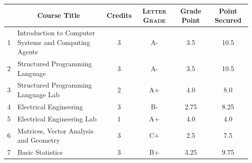 \documentclass[11pt]{article}
\newcommand*{\numtwo}[1]{\pgfmathprintnumber[
                    fixed, precision=2, fixed zerofill=true]{#1}}
\begin{document}
                \begin{center}
                    \renewcommand{\arraystretch}{1.08}
                    
                \begin{tabular}{|c|l|c|>{\scshape}c|c|c|}
                \hline  \rule[-1ex]{0pt}{3.5ex} {\centering{\bf Course Code}} &  \multicolumn{1}{c|}{\textbf{Course Title}}  & {\bf Credits} & {\bf Letter Grade} & {\bf Grade Point} & {\bf Point Secured}  \\ 
                \hline   1 &  Introduction to Computer Systems and Computing Agents		 & 3 & A- & 3.5 & 10.5 \\ %
                \hline   2 &  Structured Programming Language		 & 3 & A- & 3.5 & 10.5 \\ %
                \hline   3 &  Structured Programming Language Lab		 & 2 & A+ & 4.0 & 8.0 \\ %
                \hline   4 &  Electrical Engineering		 & 3 & B- & 2.75 & 8.25 \\ %
                \hline   5 &  Electrical Engineering Lab		 & 1 & A+ & 4.0 & 4.0 \\ %
                \hline   6 &  Matrices, Vector Analysis and Geometry		 & 3 & C+ & 2.5 & 7.5 \\ %
                \hline   7 &  Basic Statistics		 & 3 & B+ & 3.25 & 9.75 \\ %

\hline                %
                \end{tabular}
                \end{center}
                \renewcommand{\arraystretch}{1.03}
\end{document}
